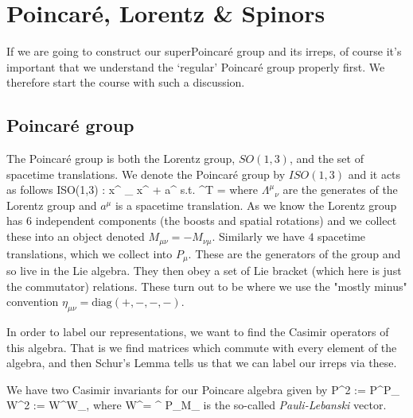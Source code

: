 \chapter{Poincar\'{e}, Lorentz \& Spinors}

If we are going to construct our superPoincar\'{e} group and its irreps, of course it's important that we understand the `regular' Poincar\'{e} group properly first. We therefore start the course with such a discussion. 

\section{Poincar\'{e} group}

The Poincar\'{e} group is both the Lorentz group, $SO(1,3)$, and the set of spacetime translations. We denote the Poincar\'{e} group by $ISO(1,3)$ and it acts as follows
\be 
    ISO(1,3) : \; x^{\mu} \mapsto {\Lambda^{\mu}}_{\nu} x^{\nu} + a^{\mu} \qquad s.t. \qquad  \Lambda^T \eta \Lambda = \eta 
\ee 
where ${\Lambda^{\mu}}_{\nu}$ are the generates of the Lorentz group and $a^{\mu}$ is a spacetime translation. As we know the Lorentz group has $6$ independent components (the boosts and spatial rotations) and we collect these into an object denoted $M_{\mu\nu} = - M_{\nu\mu}$. Similarly we have $4$ spacetime translations, which we collect into $P_{\mu}$. These are the generators of the group and so live in the Lie algebra. They then obey a set of Lie bracket (which here is just the commutator) relations. These turn out to be 
\noindent where we use the "mostly minus" convention $\eta_{\mu\nu} = \text{diag}(+,-,-,-)$. 

In order to label our representations, we want to find the Casimir operators of this algebra. That is we find matrices which commute with every element of the algebra, and then Schur's Lemma tells us that we can label our irreps via these. 

\bcl 
    We have two Casimir invariants for our Poincare algebra given by 
    \be
    \label{eqn:PoincareCasimirs}
        P^2 := P^{\mu}P_{\mu} \qand W^2 := W^{\mu}W_{\mu},
    \ee 
    where 
    \bse 
        W^\mu =  \epsilon^{\mu \nu \rho \sigma} P_\nu M_{\rho \sigma}
    \ese
    is the so-called \textit{Pauli-Lebanski} vector.
\ecl 

